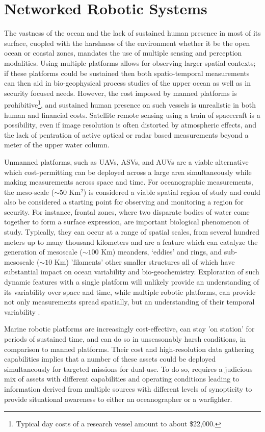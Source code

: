 \section{Networked Robotic Systems}
\label{sec:network}

The vastness of the ocean and the lack of sustained human presence in
most of its surface, cuopled with the harshness of the environment
whether it be the open ocean or coastal zones, mandates the use of
multiple sensing and perception modalities. Using multiple platforms
allows for observing larger spatial contexts; if these platforms could
be sustained then both spatio-temporal measurements can then aid in
bio-geophysical process studies of the upper ocean as well as in
security focused needs. However, the cost imposed by manned platforms
is prohibitive\footnote{Typical day costs of a research vessel amount
  to about \$22,000.}, and sustained human presence on such vessels is
unrealistic in both human and financial costs. Satellite remote
sensing using a train of spacecraft is a possibility, even if image
resolution is often distorted by atmospheric effects, and the lack of
pentration of active optical or radar based measurements beyond a
meter of the upper water column. 

Unmanned platforms, such as UAVs, ASVs, and AUVs are a viable
alternative which cost-permitting can be deployed across a large area
simultaneously while making measurements across space and time. For
oceanographic measurements, the meso-scale ($\sim 50$ Km$^2$) is
considered a viable spatial region of study and could also be
considered a starting point for observing and monitoring a region for
security. For instance, frontal zones, where two disparate bodies of
water come together to form a surface expression, are important
biological phenomenon of study. Typically, they can occur at a range
of spatial scales, from several hundred meters up to many thousand
kilometers \cite{belkin2007fronts} and are a feature which can
catalyze the generation of mesoscale ($\sim 100$ Km) meanders,
‘eddies’ and rings, and sub-mesoscale ($\sim 10$ Km) 'filaments' other
smaller structures all of which have substantial impact on ocean
variability and bio-geochemistry. Exploration of such dynamic features
with a single platform will unlikely provide an understanding of its
variability over space and time, while multiple robotic platforms, can
provide not only measurements spread spatially, but an understanding
of their temporal variability \cite{pinto20,pinto22}.

Marine robotic platforms are increasingly cost-effective, can stay 'on
station' for periods of sustained time, and can do so in unseasonably
harsh conditions, in comparison to manned platforms. Their cost and
high-resolution data gathering capabilities implies that a number of
these assets could be deployed simultaneously for targeted missions
for dual-use. To do so, requires a judicious mix of assets with
different capabilities and operating conditions leading to information
derived from multiple sources with different levels of synopticity to
provide situational awareness to either an oceanographer or a
warfighter.
